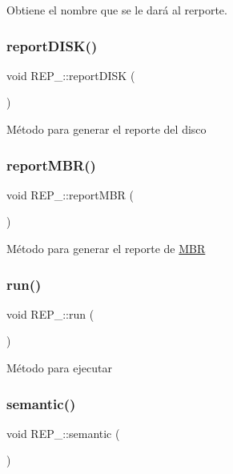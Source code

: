 Obtiene el nombre que se le dará al rerporte. \mbox{\label{classREP___aa0429938785e2c916b3c89148a4d7317}} 
\subsubsection{\texorpdfstring{report\+D\+I\+S\+K()}{reportDISK()}}
{\footnotesize\ttfamily void R\+E\+P\+\_\+\+::report\+D\+I\+SK (\begin{DoxyParamCaption}{ }\end{DoxyParamCaption})}

Método para generar el reporte del disco \mbox{\label{classREP___aa1f6945c91d9494c42a0c34338a83790}} 
\subsubsection{\texorpdfstring{report\+M\+B\+R()}{reportMBR()}}
{\footnotesize\ttfamily void R\+E\+P\+\_\+\+::report\+M\+BR (\begin{DoxyParamCaption}{ }\end{DoxyParamCaption})}

Método para generar el reporte de \hyperlink{structMBR}{M\+BR} \mbox{\label{classREP___abe74de18a398b8f428e868a316bcec58}} 
\subsubsection{\texorpdfstring{run()}{run()}}
{\footnotesize\ttfamily void R\+E\+P\+\_\+\+::run (\begin{DoxyParamCaption}{ }\end{DoxyParamCaption})}

Método para ejecutar \mbox{\label{classREP___a7b6a615bdcab7164cddb336a4b0ef1b7}} 
\subsubsection{\texorpdfstring{semantic()}{semantic()}}
{\footnotesize\ttfamily void R\+E\+P\+\_\+\+::semantic (\begin{DoxyParamCaption}{ }\end{DoxyParamCaption})}

